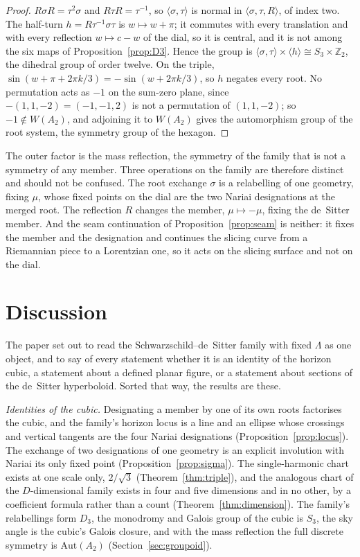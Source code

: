 \documentclass[11pt]{article}
\theoremstyle{plain}
\theoremstyle{definition}
\theoremstyle{remark}
\begin{document}
\begin{proof}
$R\sigma R=\tau^{2}\sigma$ and $R\tau R=\tau^{-1}$, so $\langle\sigma,\tau\rangle$ is normal in $\langle\sigma,\tau,R\rangle$, of index two. The
half-turn $h=R\tau^{-1}\sigma\tau$ is $w\mapsto w+\pi$; it commutes with every translation and with every reflection
$w\mapsto c-w$ of the dial, so it is central, and it is not among the six maps of Proposition~\ref{prop:D3}. Hence
the group is $\langle\sigma,\tau\rangle\times\langle h\rangle\cong S_{3}\times\mathbb{Z}_{2}$, the dihedral group of order twelve. On the
triple, $\sin(w+\pi+2\pi k/3)=-\sin(w+2\pi k/3)$, so $h$ negates every root. No permutation acts as $-1$ on the
sum-zero plane, since $-(1,1,-2)=(-1,-1,2)$ is not a permutation of $(1,1,-2)$; so $-1\notin W(A_{2})$, and adjoining
it to $W(A_{2})$ gives the automorphism group of the root system, the symmetry group of the hexagon.
\end{proof}

The outer factor is the mass reflection, the symmetry of the family that is not a symmetry of any member. Three
operations on the family are therefore distinct and should not be confused. The root exchange $\sigma$ is a
relabelling of one geometry, fixing $\mu$, whose fixed points on the dial are the two Nariai designations at the
merged root. The reflection $R$
changes the member, $\mu\mapsto-\mu$, fixing the de~Sitter member. And the seam continuation of
Proposition~\ref{prop:seam} is neither: it fixes the member and the designation and continues the slicing
curve from a Riemannian piece to a Lorentzian one, so it acts on the slicing surface and not on the dial.

\section{Discussion}\label{sec:discussion}

The paper set out to read the Schwarzschild--de~Sitter family with fixed $\Lambda$ as one object, and to say of
every statement whether it is an identity of the horizon cubic, a statement about a defined planar figure, or a
statement about sections of the de~Sitter hyperboloid. Sorted that way, the results are these.

\emph{Identities of the cubic.} Designating a member by one of its own roots factorises the cubic, and the
family's horizon locus is a line and an ellipse whose crossings and vertical tangents are the four Nariai
designations (Proposition~\ref{prop:locus}). The exchange of two designations of one geometry is an explicit
involution with Nariai its only fixed point (Proposition~\ref{prop:sigma}). The single-harmonic chart exists at
one scale only, $2/\sqrt3$ (Theorem~\ref{thm:triple}), and the analogous chart of the $D$-dimensional family exists
in four and five dimensions and in no other, by a coefficient formula rather than a count
(Theorem~\ref{thm:dimension}). The family's relabellings form $D_{3}$, the monodromy and Galois group of the cubic
is $S_{3}$, the sky angle is the cubic's Galois closure, and with the mass reflection the full discrete symmetry
is $\mathrm{Aut}(A_{2})$ (Section~\ref{sec:groupoid}).
\end{document}

